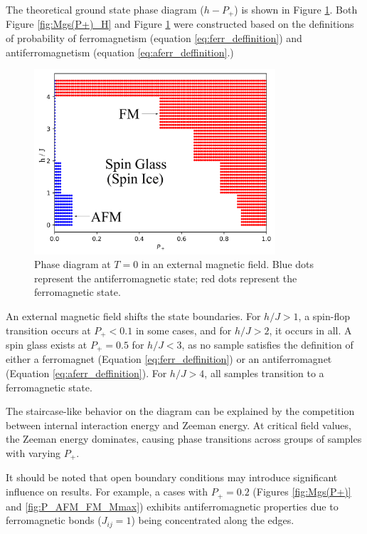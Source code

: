 \documentclass[preprint,12pt]{elsarticle}
\begin{document}
	The theoretical ground state phase diagram ($h-P_+$) is shown in Figure \ref{fig:P+_afm_fm(H)}. Both Figure \ref{fig:Mgs(P+)_H} and Figure \ref{fig:P+_afm_fm(H)} were constructed based on the definitions of probability of ferromagnetism (equation \eqref{eq:ferr_deffinition}) and antiferromagnetism (equation \eqref{eq:aferr_deffinition}.)
	
	\begin{figure}[H]
		\centering
		\includegraphics[width=0.8\textwidth]{images/P+_afm_fm(H)_filled.png}
		\caption{Phase diagram at $T = 0$ in an external magnetic field. Blue dots represent the antiferromagnetic state; red dots represent the ferromagnetic state.}
		\label{fig:P+_afm_fm(H)}
	\end{figure}
	
	An external magnetic field shifts the state boundaries. For $h/J > 1$, a spin-flop transition occurs at $P_+ < 0.1$ in some cases, and for $h/J > 2$, it occurs in all. A spin glass exists at $P_+ = 0.5$ for $h/J < 3$, as no sample satisfies the definition of either a ferromagnet (Equation \eqref{eq:ferr_deffinition}) or an antiferromagnet (Equation \eqref{eq:aferr_deffinition}). For $h/J > 4$, all samples transition to a ferromagnetic state. 
	
	The staircase-like behavior on the diagram can be explained by the competition between internal interaction energy and Zeeman energy. At critical field values, the Zeeman energy dominates, causing phase transitions across groups of samples with varying $P_+$.
	
	It should be noted that open boundary conditions may introduce significant influence on results. For example, a cases with $P_+ = 0.2$ (Figures \ref{fig:Mgs(P+)} and \ref{fig:P_AFM_FM_Mmax}) exhibits antiferromagnetic properties due to ferromagnetic bonds ($J_{ij} = 1$) being concentrated along the edges.
	
\end{document}
